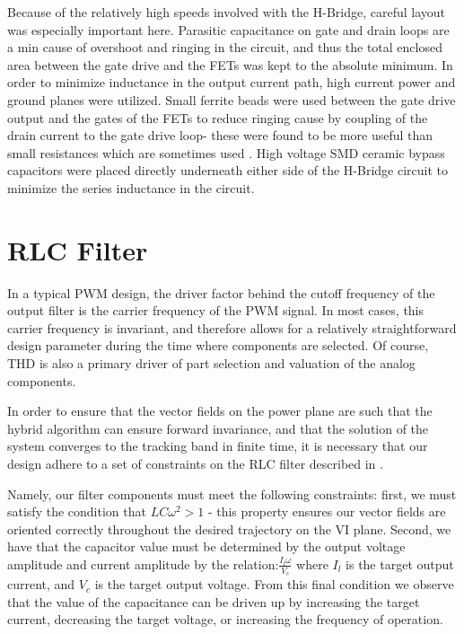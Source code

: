 Because of the relatively high speeds involved with the H-Bridge, careful layout was especially important here. Parasitic capacitance on gate and drain loops are a min cause of overshoot and ringing in the circuit, and thus the total enclosed area between the gate drive and the FETs was kept to the absolute minimum. In order to minimize inductance in the output current path, high current power and ground planes were utilized. Small ferrite beads were used between the gate drive output and the gates of the FETs to reduce ringing cause by coupling of the drain current to the gate drive loop- these were found to be more useful than small resistances which are sometimes used \cite{transphorm}. High voltage SMD ceramic bypass capacitors were placed directly underneath either side of the H-Bridge circuit to minimize the series inductance in the circuit. 
  
\section{RLC Filter}
In a typical PWM design, the driver factor behind the cutoff frequency of the output filter is the carrier frequency of the PWM signal. In most cases, this carrier frequency is invariant, and therefore allows for a relatively straightforward design parameter during the time where components are selected. Of course, THD is also a primary driver of part selection and valuation of the analog components.


In order to ensure that the vector fields on the power plane are such that the hybrid algorithm can ensure forward invariance, and that the solution of the system converges to the tracking band in finite time,  it is necessary that our design adhere to a set of constraints on the RLC filter described in \cite{ricardo}. 

Namely, our filter components must meet the following constraints: first, we must satisfy the condition that $LC\omega^2>1$ - this property ensures our vector fields are oriented correctly throughout the desired trajectory on the VI plane. Second, we have that the capacitor value must be determined by the output voltage amplitude and current amplitude by the relation:$\frac{I_l\omega}{V_c}$ where $I_l$ is the target output current, and $V_c$ is the target output voltage. From this final condition we observe that the value of the capacitance can be driven up by increasing the target current, decreasing the target voltage, or increasing the frequency of operation. 

